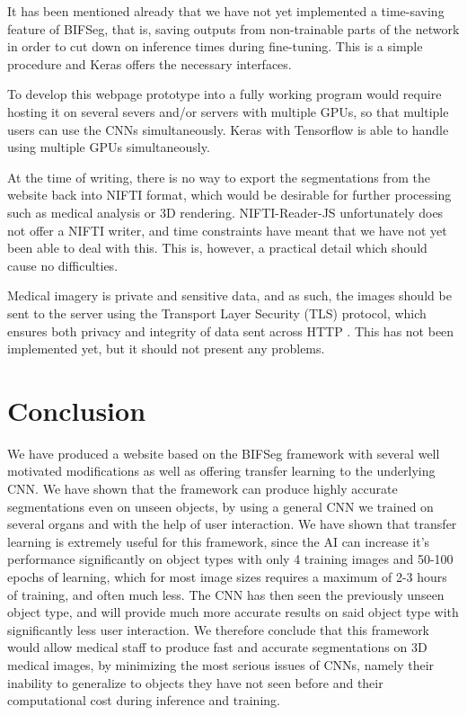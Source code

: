It has been mentioned already that we have not yet implemented a time-saving feature of BIFSeg, that is, saving outputs from non-trainable parts of the network in order to cut down on inference times during fine-tuning. This is a simple procedure and Keras offers the necessary interfaces.

To develop this webpage prototype into a fully working program would require hosting it on several severs and/or servers with multiple GPUs, so that multiple users can use the CNNs simultaneously. Keras with Tensorflow is able to handle using multiple GPUs simultaneously.

At the time of writing, there is no way to export the segmentations from the website back into NIFTI format, which would be desirable for further processing such as medical analysis or 3D rendering. NIFTI-Reader-JS unfortunately does not offer a NIFTI writer, and time constraints have meant that we have not yet been able to deal with this. This is, however, a practical detail which should cause no difficulties.

Medical imagery is private and sensitive data, and as such, the images should be sent to the server using the Transport Layer Security (TLS) protocol, which ensures both privacy and integrity of data sent across HTTP \cite{TLS}. This has not been implemented yet, but it should not present any problems.

\section{Conclusion}

We have produced a website based on the BIFSeg framework with several well motivated modifications as well as offering transfer learning to the underlying CNN. We have shown that the framework can produce highly accurate segmentations even on unseen objects, by using a general CNN we trained on several organs and with the help of user interaction. We have shown that transfer learning is extremely useful for this framework, since the AI can increase it's performance significantly on object types with only 4 training images and 50-100 epochs of learning, which for most image sizes requires a maximum of 2-3 hours of training, and often much less. The CNN has then seen the previously unseen object type, and will provide much more accurate results on said object type with significantly less user interaction. We therefore conclude that this framework would allow medical staff to produce fast and accurate segmentations on 3D medical images, by minimizing the most serious issues of CNNs, namely their inability to generalize to objects they have not seen before and their computational cost during inference and training.   







